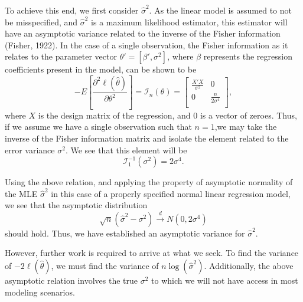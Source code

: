 		To achieve this end, we first consider $\hat{\sigma}^2$. As the linear model is assumed to not be misspecified, and $\hat{\sigma}^2$ is a maximum likelihood
		estimator, this estimator will have an asymptotic variance related to the inverse of the Fisher information (Fisher, 1922). In the case of a single
		observation, the Fisher information as it relates to the parameter vector $\theta' = [\beta', \sigma^2]$, where $\beta$ represents the regression coefficients
		present in the model, can be shown to be
		\begin{equation*}
			- E \left[ \frac{\partial^2 \ell (\hat{\theta}  )}{\partial \theta^2} \right] = \mathcal{I}_{n}(\theta) =
			\begin{bmatrix}
				\frac{X' X}{\sigma^2} & 0 \\
				0 & \frac{n}{2 \sigma^4} \\
			\end{bmatrix}
			,
		\end{equation*}
		where $X$ is the design matrix of the regression, and $0$ is a vector of zeroes. Thus, if we assume we have a single observation
		such that $n=1$,we may take the inverse of the Fisher information matrix and isolate the element related to the error variance $\sigma^2$. We see that
		this element will be
		\begin{equation*}
			\mathcal{I}_{1}^{-1}(\sigma ^2) = 2 \sigma ^4 .
		\end{equation*}
		
		Using the above relation, and applying the property of asymptotic normality of the MLE $\hat{\sigma}^2$ in this case of a properly specified normal linear
		regression model, we see that the asymptotic distribution
		\begin{equation*}
			\sqrt{n} (\hat{\sigma}^2 - \sigma^2) \xrightarrow[]{d} N(0, 2 \sigma ^4 )
		\end{equation*}
		should hold. Thus, we have established an asymptotic variance for $\hat{\sigma}^2$.

		However, further work is required to arrive at what we seek. To find the variance of $-2 \ell (\hat{\theta}  )$, we must find the variance of $n \log(\hat{\sigma}^2)$.
		Additionally, the above asymptotic relation involves the true $\sigma^2$ to which we will not have access in most modeling scenarios.

